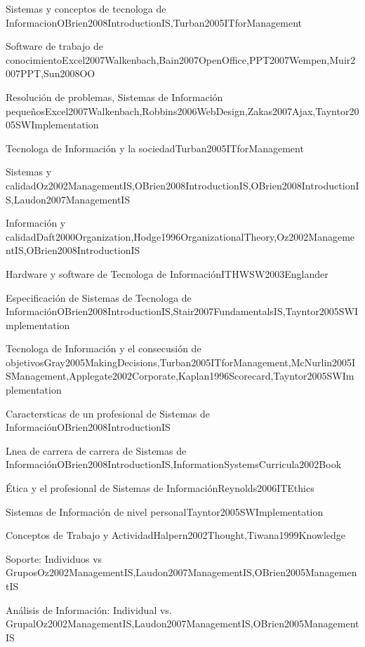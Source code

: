 \begin{LU1}{Sistemas y conceptos de tecnolog­a de Informacion}{OBrien2008IntroductionIS,Turban2005ITforManagement}{}
\begin{LU2}{Software de trabajo de conocimiento}{Excel2007Walkenbach,Bain2007OpenOffice,PPT2007Wempen,Muir2007PPT,Sun2008OO}{}
\begin{LU3}{Resolución de problemas, Sistemas de Información pequeños}{Excel2007Walkenbach,Robbins2006WebDesign,Zakas2007Ajax,Tayntor2005SWImplementation}{}
\begin{LU4}{Tecnolog­a de Información y la sociedad}{Turban2005ITforManagement}{}
\begin{LU5}{Sistemas y calidad}{Oz2002ManagementIS,OBrien2008IntroductionIS,OBrien2008IntroductionIS,Laudon2007ManagementIS}{}
\begin{LU6}{Información y calidad}{Daft2000Organization,Hodge1996OrganizationalTheory,Oz2002ManagementIS,OBrien2008IntroductionIS}{}
\begin{LU7}{Hardware y software de Tecnolog­a de Información}{ITHWSW2003Englander}{}
\begin{LU8}{Especificación de Sistemas de Tecnolog­a de Información}{OBrien2008IntroductionIS,Stair2007FundamentalsIS,Tayntor2005SWImplementation}{}
\begin{LU9}{Tecnolog­a de Información y el consecusión de objetivos}{Gray2005MakingDecisions,Turban2005ITforManagement,McNurlin2005ISManagement,Applegate2002Corporate,Kaplan1996Scorecard,Tayntor2005SWImplementation}{}
\begin{LU10}{Caracter­sticas de un profesional de Sistemas de Información}{OBrien2008IntroductionIS}{}
\begin{LU11}{L­nea de carrera de carrera de Sistemas de Información}{OBrien2008IntroductionIS,InformationSystemsCurricula2002Book}{}
\begin{LU12}{Ética y el profesional de Sistemas de Información}{Reynolds2006ITEthics}{}
\begin{LU13}{Sistemas de Información de nivel personal}{Tayntor2005SWImplementation}{}
\begin{LU13.01}[LU13]{Conceptos de Trabajo y Actividad}{Halpern2002Thought,Tiwana1999Knowledge}{}
\begin{LU13.02}[LU13]{Soporte: Individuos vs Grupos}{Oz2002ManagementIS,Laudon2007ManagementIS,OBrien2005ManagementIS}{}
\begin{LU13.03}[LU13]{Análisis de Información: Individual vs. Grupal}{Oz2002ManagementIS,Laudon2007ManagementIS,OBrien2005ManagementIS}{}
\end{LU13.03}
\end{LU13.02}
\end{LU13.01}
\end{LU13}
\end{LU12}
\end{LU11}
\end{LU10}
\end{LU9}
\end{LU8}
\end{LU7}
\end{LU6}
\end{LU5}
\end{LU4}
\end{LU3}
\end{LU2}
\end{LU1}
